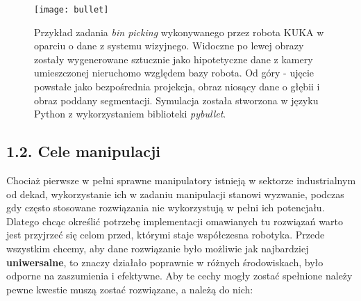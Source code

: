 \documentclass{article}
\begin{document}
\begin{figure}[h]
\texttt{[image: bullet]}
\caption{Przykład zadania \emph{bin picking} wykonywanego przez robota KUKA w oparciu o dane z systemu wizyjnego. Widoczne po lewej obrazy zostały wygenerowane sztucznie jako hipotetyczne dane z kamery umieszczonej nieruchomo względem bazy robota. Od góry - ujęcie powstałe jako bezpośrednia projekcja, obraz niosący dane o głębii i obraz poddany segmentacji. Symulacja została stworzona w języku Python z wykorzystaniem biblioteki \emph{pybullet}.}
\end{figure}

\subsection*{\LARGE{1.2. Cele manipulacji}} 

Chociaż pierwsze w pełni sprawne manipulatory istnieją w sektorze industrialnym od dekad, wykorzystanie ich w zadaniu manipulacji stanowi wyzwanie, podczas gdy często stosowane rozwiązania nie wykorzystują w pełni ich potencjału. Dlatego chcąc określić potrzebę implementacji omawianych tu rozwiązań warto jest przyjrzeć się celom przed, którymi staje współczesna robotyka. Przede wszystkim chcemy, aby dane rozwiązanie było możliwie jak najbardziej \textbf{uniwersalne}, to znaczy działało poprawnie w różnych środowiskach, było odporne na zaszumienia i efektywne. Aby te cechy mogły zostać spełnione należy pewne kwestie muszą zostać rozwiązane, a należą do nich:
\end{document}
